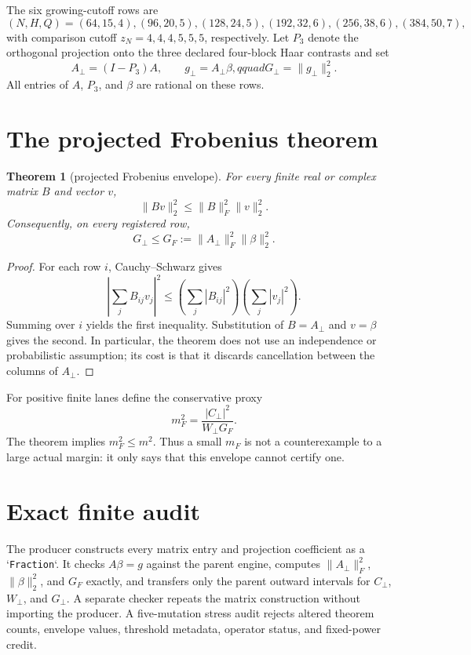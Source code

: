 \documentclass[11pt]{article}
\newcommand{\Aperp}{A_{\perp}}
\newcommand{\Gperp}{G_{\perp}}
\newcommand{\GF}{G_F}
\newcommand{\Cperp}{C_{\perp}}
\newcommand{\Wperp}{W_{\perp}}
\newcommand{\mF}{m_F}
\newtheorem{theorem}{Theorem}
\begin{document}
The six growing-cutoff rows are
\[
 (N,H,Q)=(64,15,4),(96,20,5),(128,24,5),
 (192,32,6),(256,38,6),(384,50,7),
\]
with comparison cutoff \(z_N=4,4,4,5,5,5\), respectively.  Let \(P_3\)
denote the orthogonal projection onto the three declared four-block Haar
contrasts and set
\[
 \Aperp=(I-P_3)A,\qquad g_{\perp}=\Aperp\beta,qquad
 \Gperp=\|g_{\perp}\|_2^2.
\]
All entries of \(A\), \(P_3\), and \(\beta\) are rational on these rows.

\section{The projected Frobenius theorem}

\begin{theorem}[projected Frobenius envelope]
For every finite real or complex matrix \(B\) and vector \(v\),
\[
 \|Bv\|_2^2\leq \|B\|_F^2\|v\|_2^2.
\]
Consequently, on every registered row,
\[
 \Gperp\leq \GF:=\|\Aperp\|_F^2\|\beta\|_2^2.
\]
\end{theorem}

\begin{proof}
For each row \(i\), Cauchy--Schwarz gives
\[
 \left|\sum_jB_{ij}v_j\right|^2
 \leq\left(\sum_j|B_{ij}|^2\right)\left(\sum_j|v_j|^2\right).
\]
Summing over \(i\) yields the first inequality.  Substitution of
\(B=\Aperp\) and \(v=\beta\) gives the second.  In particular, the theorem
does not use an independence or probabilistic assumption; its cost is that it
discards cancellation between the columns of \(\Aperp\).
\end{proof}

For positive finite lanes define the conservative proxy
\[
 \mF^2=\frac{|\Cperp|^2}{\Wperp\GF}.
\]
The theorem implies \(\mF^2\leq m^2\).  Thus a small \(\mF\) is not a
counterexample to a large actual margin: it only says that this envelope cannot
certify one.

\section{Exact finite audit}

The producer constructs every matrix entry and projection coefficient as a
`\texttt{Fraction}`.  It checks \(A\beta=g\) against the parent engine, computes
\(\|\Aperp\|_F^2\), \(\|\beta\|_2^2\), and \(\GF\) exactly, and transfers only
the parent outward intervals for \(\Cperp\), \(\Wperp\), and \(\Gperp\).  A
separate checker repeats the matrix construction without importing the
producer.  A five-mutation stress audit rejects altered theorem counts,
envelope values, threshold metadata, operator status, and fixed-power credit.
\end{document}
